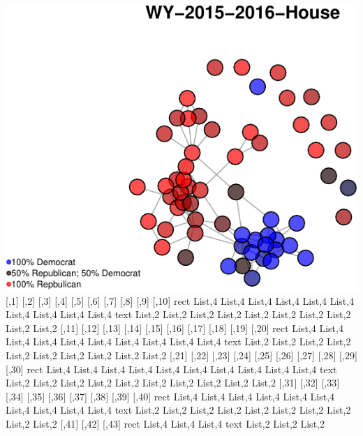 \documentclass[]{article}
\begin{document}
\includegraphics{Final_Project_RMarkdown_Updated_files/figure-latex/unnamed-chunk-10-43.pdf}
{[},1{]} {[},2{]} {[},3{]} {[},4{]} {[},5{]} {[},6{]} {[},7{]} {[},8{]}
{[},9{]} {[},10{]} rect List,4 List,4 List,4 List,4 List,4 List,4 List,4
List,4 List,4 List,4 text List,2 List,2 List,2 List,2 List,2 List,2
List,2 List,2 List,2 List,2 {[},11{]} {[},12{]} {[},13{]} {[},14{]}
{[},15{]} {[},16{]} {[},17{]} {[},18{]} {[},19{]} {[},20{]} rect List,4
List,4 List,4 List,4 List,4 List,4 List,4 List,4 List,4 List,4 text
List,2 List,2 List,2 List,2 List,2 List,2 List,2 List,2 List,2 List,2
{[},21{]} {[},22{]} {[},23{]} {[},24{]} {[},25{]} {[},26{]} {[},27{]}
{[},28{]} {[},29{]} {[},30{]} rect List,4 List,4 List,4 List,4 List,4
List,4 List,4 List,4 List,4 List,4 text List,2 List,2 List,2 List,2
List,2 List,2 List,2 List,2 List,2 List,2 {[},31{]} {[},32{]} {[},33{]}
{[},34{]} {[},35{]} {[},36{]} {[},37{]} {[},38{]} {[},39{]} {[},40{]}
rect List,4 List,4 List,4 List,4 List,4 List,4 List,4 List,4 List,4
List,4 text List,2 List,2 List,2 List,2 List,2 List,2 List,2 List,2
List,2 List,2 {[},41{]} {[},42{]} {[},43{]} rect List,4 List,4 List,4
text List,2 List,2 List,2
\end{document}
